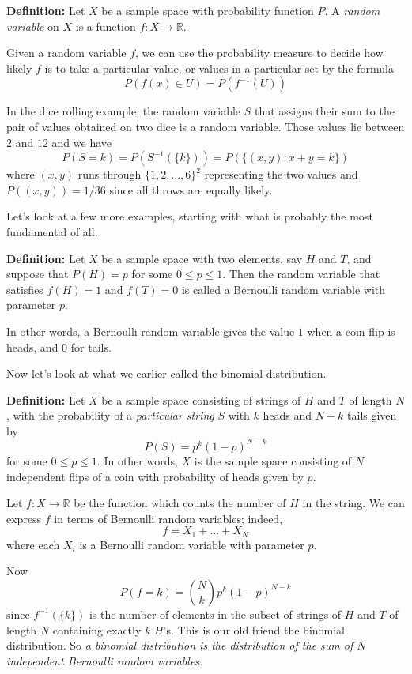 \documentclass[
  11pt,
  letterpaper,
]{scrbook}
\theoremstyle{plain}
\theoremstyle{remark}
\begin{document}
\textbf{Definition:} Let \(X\) be a sample space with probability
function \(P\). A \emph{random variable} on \(X\) is a function
\(f:X\to \mathbb{R}\).

Given a random variable \(f\), we can use the probability measure to
decide how likely \(f\) is to take a particular value, or values in a
particular set by the formula \[
P(f(x)\in U) = P(f^{-1}(U))
\]

In the dice rolling example, the random variable \(S\) that assigns
their sum to the pair of values obtained on two dice is a random
variable. Those values lie between \(2\) and \(12\) and we have \[
P(S=k) = P(S^{-1}(\{k\}))=P(\{(x,y): x+y=k\})
\] where \((x,y)\) runs through \(\{1,2,\ldots,6\}^{2}\) representing
the two values and \(P((x,y))=1/36\) since all throws are equally
likely.

Let's look at a few more examples, starting with what is probably the
most fundamental of all.

\textbf{Definition:} Let \(X\) be a sample space with two elements, say
\(H\) and \(T\), and suppose that \(P(H)=p\) for some \(0\le p\le 1\).
Then the random variable that satisfies \(f(H)=1\) and \(f(T)=0\) is
called a Bernoulli random variable with parameter \(p\).

In other words, a Bernoulli random variable gives the value \(1\) when a
coin flip is heads, and \(0\) for tails.

Now let's look at what we earlier called the binomial distribution.

\textbf{Definition:} Let \(X\) be a sample space consisting of strings
of \(H\) and \(T\) of length \(N\), with the probability of a
\emph{particular string} \(S\) with \(k\) heads and \(N-k\) tails given
by \[
P(S)=p^{k}(1-p)^{N-k}
\] for some \(0\le p\le 1\). In other words, \(X\) is the sample space
consisting of \(N\) independent flips of a coin with probability of
heads given by \(p\).

Let \(f:X\to \mathbb{R}\) be the function which counts the number of
\(H\) in the string. We can express \(f\) in terms of Bernoulli random
variables; indeed, \[
f=X_1+\ldots+X_N
\] where each \(X_i\) is a Bernoulli random variable with parameter
\(p\).

Now \[
P(f=k) = \binom{N}{k}p^{k}(1-p)^{N-k}
\] since \(f^{-1}(\{k\})\) is the number of elements in the subset of
strings of \(H\) and \(T\) of length \(N\) containing exactly \(k\)
\(H\)'s. This is our old friend the binomial distribution. So \emph{a
binomial distribution is the distribution of the sum of \(N\)
independent Bernoulli random variables.}
\end{document}
